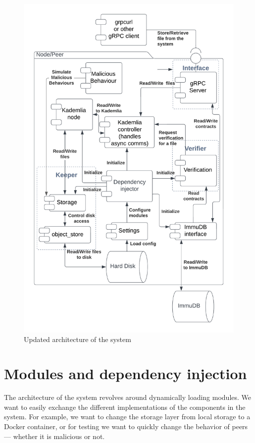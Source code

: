 \begin{figure}
    \centering
    \includegraphics[width=1\textwidth]{gfx/architecture.png}
    \caption{Updated architecture of the system}
    \label{fig:architecture}
\end{figure}

\section{Modules and dependency injection}

The architecture of the system revolves around dynamically loading modules.
We want to easily exchange the different implementations of the components in the system.
For example, we want to change the storage layer from local storage to a Docker container,
or for testing we want to quickly change the behavior of peers --- whether it is malicious or not.

